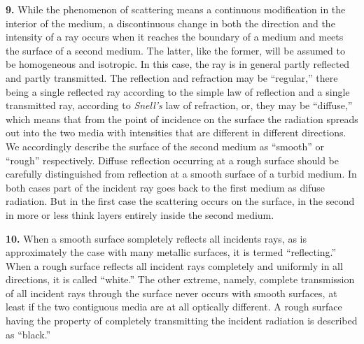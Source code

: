 \documentclass[12pt,oneside]{book}
\begin{document}
\textbf{9.} While the phenomenon of scattering means a continuous modification in the interior of the medium, a discontinuous change in both the direction and the intensity of a ray occurs when it reaches the boundary of a medium and meets the surface of a second medium. The latter, like the former, will be assumed to be homogeneous and isotropic. In this case, the ray is in general partly reflected and partly transmitted. The reflection and refraction may be ``regular,'' there being a single reflected ray according to the simple law of reflection and a single transmitted ray, according to \textit{Snell's} law of refraction, or, they may be ``diffuse,'' which means that from the point of incidence on the surface the radiation spreads out into the two media with intensities that are different in different directions. We accordingly describe the surface of the second medium as ``smooth'' or ``rough'' respectively. Diffuse reflection occurring at a rough surface should be carefully distinguished from reflection at a smooth surface of a turbid medium. In both cases part of the incident ray goes back to the first medium as difuse radiation. But in the first case the scattering occurs on the surface, in the second in more or less think layers entirely inside the second medium. \par 

\textbf{10.} When a smooth surface sompletely reflects all incidents rays, as is approximately the case with many metallic surfaces, it is termed ``reflecting.'' When a rough surface reflects all incident rays completely and uniformly in all directions, it is called ``white.'' The other extreme, namely, complete  transmission of all incident rays through the surface never occurs with smooth surfaces, at least if the two contiguous media are at all optically different. A rough surface having the property of completely transmitting the incident radiation is described as ``black.'' \par 
\end{document}
